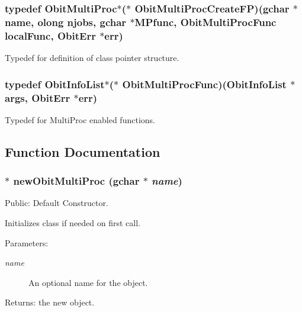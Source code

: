\subsubsection{\setlength{\rightskip}{0pt plus 5cm}typedef {\bf Obit\-Multi\-Proc}$\ast$($\ast$ {\bf Obit\-Multi\-Proc\-Create\-FP})(gchar $\ast$name, {\bf olong} njobs, gchar $\ast$MPfunc, {\bf Obit\-Multi\-Proc\-Func} local\-Func, {\bf Obit\-Err} $\ast$err)}\label{ObitMultiProc_8h_a4}


Typedef for definition of class pointer structure. 

\subsubsection{\setlength{\rightskip}{0pt plus 5cm}typedef {\bf Obit\-Info\-List}$\ast$($\ast$ {\bf Obit\-Multi\-Proc\-Func})({\bf Obit\-Info\-List} $\ast$args, {\bf Obit\-Err} $\ast$err)}\label{ObitMultiProc_8h_a3}


Typedef for Multi\-Proc enabled functions. 



\subsection{Function Documentation}
\subsubsection{$\ast$ new\-Obit\-Multi\-Proc (gchar $\ast$ {\em name})}\label{ObitMultiProc_8h_a6}


Public: Default Constructor. 

Initializes class if needed on first call. \begin{Desc}
\item[Parameters:]
\begin{description}
\item[{\em name}]An optional name for the object. \end{description}
\end{Desc}
\begin{Desc}
\item[Returns:]the new object. \end{Desc}
